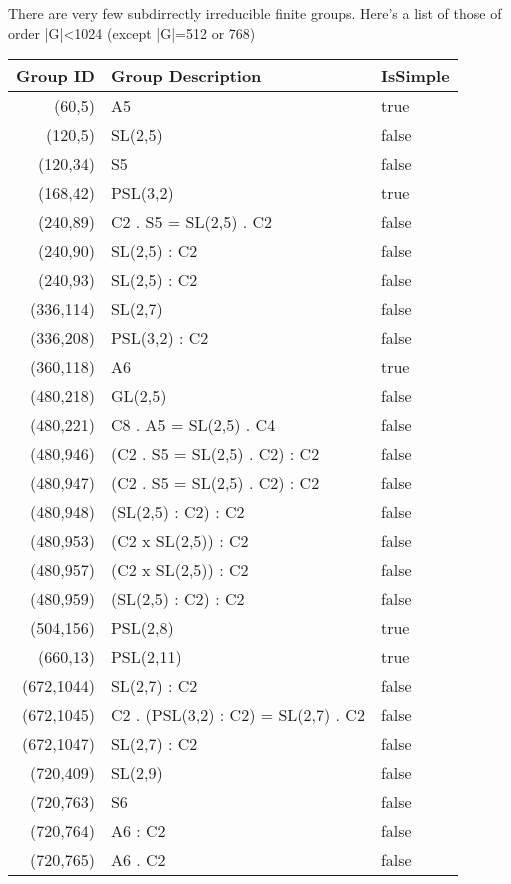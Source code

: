 \documentclass[11pt]{article}
\theoremstyle{plain}
\theoremstyle{definition}
\theoremstyle{remark}
\theoremstyle{remark}
\newcommand{\<}{\ensuremath{\langle}}
\renewcommand{\>}{\ensuremath{\rangle}}
\begin{document}
{\renewcommand{\thefootnote}{}}
There are very few subdirrectly irreducible finite groups.  
Here's a list of those of order |G|<1024 (except |G|=512 or 768)
\begin{center}
  
\begin{tabular}{r|l|l}
Group ID  &   Group Description  &  IsSimple\\
\hline
(60,5) &  A5  &  true\\
(120,5) &   SL(2,5)   & false\\
(120,34) &   S5   & false\\
(168,42) &   PSL(3,2)  &  true\\
(240,89) &   C2 . S5 = SL(2,5) . C2   & false\\
(240,90) &   SL(2,5) : C2   & false\\
(240,93) &   SL(2,5) : C2   & false\\
(336,114) &   SL(2,7)   & false\\
(336,208) &   PSL(3,2) : C2   & false\\
(360,118)&  A6 &   true\\
(480,218) &   GL(2,5)   & false\\
(480,221) &   C8 . A5 = SL(2,5) . C4   & false\\
(480,946) &   (C2 . S5 = SL(2,5) . C2) : C2   & false\\
(480,947) &   (C2 . S5 = SL(2,5) . C2) : C2   & false\\
(480,948) &   (SL(2,5) : C2) : C2   & false\\
(480,953) &   (C2 x SL(2,5)) : C2   & false\\
(480,957) &   (C2 x SL(2,5)) : C2   & false\\
(480,959) &   (SL(2,5) : C2) : C2   & false\\
(504,156) &   PSL(2,8) &   true\\
(660,13)  &   PSL(2,11)&   true\\
(672,1044) &   SL(2,7) : C2   & false\\
(672,1045) &   C2 . (PSL(3,2) : C2) = SL(2,7) . C2   & false\\
(672,1047) &   SL(2,7) : C2   & false\\
(720,409) &   SL(2,9)   & false\\
(720,763) &   S6   & false\\
(720,764) &   A6 : C2   & false\\
(720,765) &   A6 . C2   & false\\

\end{tabular}
\end{center}
\end{document}
